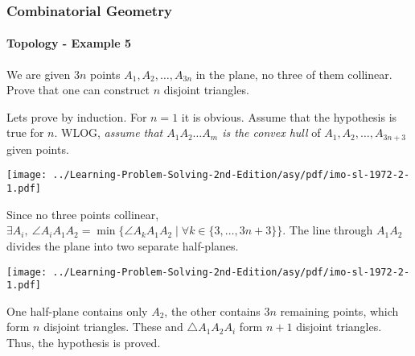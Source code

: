 \documentclass[8pt,xcolor=table,dvipsnames]{beamer}
\begin{document}
\begin{frame}[t]
    \frametitle{Combinatorial Geometry}
    \framesubtitle{Topology - Example 5}
    \begin{example}[IMO SL 1972/2]
        We are given $3n$ points $A_1,A_2, \ldots , A_{3n}$ in the plane, no three of them collinear.
        Prove that one can construct $n$ disjoint triangles.
    \end{example}
    \begin{overprint}
        Lets prove by induction. For $n=1$ it is obvious. Assume that the hypothesis is true for $n$. 
        WLOG, \textit{assume that $A_1A_2\ldots A_m$ is the convex hull} of $A_1,A_2, \ldots, A_{3n+3}$ given points.
        \begin{center}
            \texttt{[image: ../Learning-Problem-Solving-2nd-Edition/asy/pdf/imo-sl-1972-2-1.pdf]}
        \end{center}
        Since no three points collinear,
        $\exists A_i,\ \angle A_iA_1A_2 = \min \{ \angle A_kA_1A_2 \mid \forall k \in \{ 3,\ldots, 3n+3 \} \}.$
        The line through $A_1A_2$ divides the plane into two separate half-planes.
        \begin{center}
            \texttt{[image: ../Learning-Problem-Solving-2nd-Edition/asy/pdf/imo-sl-1972-2-1.pdf]}
        \end{center}
        One half-plane contains only $A_2$, the other contains $3n$ remaining points,
        which form $n$ disjoint triangles. These and $\triangle A_1A_2A_i$ form $n+1$ disjoint triangles.
        Thus, the hypothesis is proved.
    \end{overprint}
\end{frame}
\end{document}
